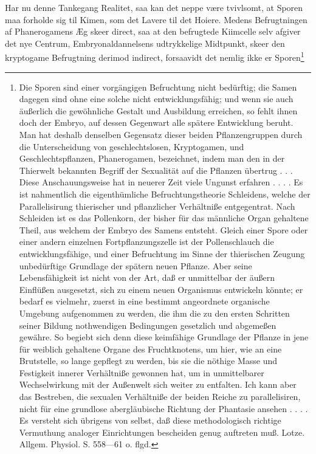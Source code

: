 \documentclass[11pt]{book}
\begin{document}
Har nu denne Tankegang Realitet, saa kan det neppe være tvivlsomt, at
Sporen maa forholde sig til Kimen, som det Lavere til det Hoiere. Medens
Befrugtningen af Phanerogamens Æg skeer direct, saa at den befrugtede
Kiimcelle selv afgiver det nye Centrum, Embryonaldannelsens udtrykkelige
Midtpunkt, skeer den kryptogame Befrugtning derimod indirect, forsaavidt
det nemlig ikke er Sporen\footnote{%
Die Sporen sind einer vorgängigen Befruchtung nicht bedürftig; die Samen
dagegen sind ohne eine solche nicht entwicklungsfähig; und wenn sie auch
äußerlich die gewöhnliche Gestalt und Ausbildung erreichen, so fehlt
ihnen doch der Embryo, auf dessen Gegenwart alle spätere Entwicklung
beruht. Man hat deshalb denselben Gegensatz dieser beiden
Pflanzengruppen durch die Unterscheidung von geschlechtslosen,
Kryptogamen, und Geschlechtspflanzen, Phanerogamen, bezeichnet, indem
man den in der Thierwelt bekannten Begriff der Sexualität auf die
Pflanzen übertrug . . . Diese Anschauungsweise hat in neuerer Zeit viele
Ungunst erfahren . . . . Es ist nahmentlich die eigenthümliche
Befruchtungstheorie Schleidens, welche der Parallelisirung thierischer
und pflanzlicher Verhältniße entgegentrat. Nach Schleiden ist es das
Pollenkorn, der bisher für das männliche Organ gehaltene Theil, aus
welchem der Embryo des Samens entsteht. Gleich einer Spore oder einer
andern einzelnen Fortpflanzungszelle ist der Pollenschlauch die
entwicklungsfähige, und einer Befruchtung im Sinne der thierischen
Zeugung unbedürftige Grundlage der spätern neuen Pflanze. Aber seine
Lebensfähigkeit ist nicht von der Art, daß er unmittelbar der äußern
Einflüßen ausgesetzt, sich zu einem neuen Organismus entwickeln könnte;
er bedarf es vielmehr, zuerst in eine bestimmt angeordnete organische
Umgebung aufgenommen zu werden, die ihm die zu den ersten Schritten
seiner Bildung nothwendigen Bedingungen gesetzlich und abgemeßen
gewähre. So begiebt sich denn diese keimfähige Grundlage der Pflanze in
jene für weiblich gehaltene Organe des Fruchtknotens, um hier, wie an
eine Brutstelle, so lange gepflegt zu werden, bis sie die nöthige Masse
und Festigkeit innerer Verhältniße gewonnen
hat, um in unmittelbarer Wechselwirkung mit der Außenwelt sich weiter zu
entfalten. Ich kann aber das Bestreben, die sexualen Verhältniße der
beiden Reiche zu parallelisiren, nicht für eine grundlose abergläubische
Richtung der Phantasie ansehen . . . . Es versteht sich übrigens von
selbst, daß diese methodologisch richtige Vermuthung analoger
Einrichtungen bescheiden genug auftreten muß. Lotze. Allgem. Physiol.
S. 558---61 o. flgd.

}
\end{document}

